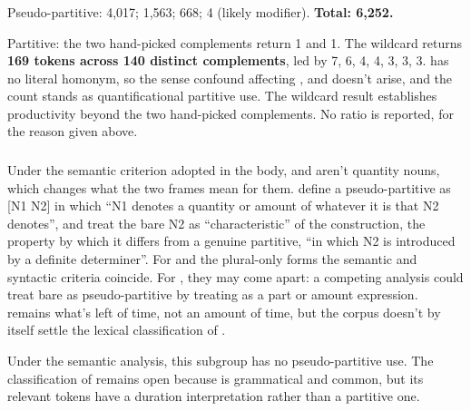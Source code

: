 \subsubsection{\texorpdfstring{}{Plenty}}

Pseudo-partitive:  4,017;  1,563;  668;  4 (likely modifier). \textbf{Total: 6,252.}

Partitive: the two hand-picked complements return  1 and  1. The wildcard  returns \textbf{169 tokens across 140 distinct complements}, led by  7,  6,  4,  4,  3,  3,  3.  has no literal homonym, so the sense confound affecting , and  doesn't arise, and the count stands as quantificational partitive use. The wildcard result establishes productivity beyond the two hand-picked complements. No ratio is reported, for the reason given above.

\subsubsection{\texorpdfstring{}{Rest, remainder}}

Under the semantic criterion adopted in the body,  and  aren't quantity nouns, which changes what the two frames mean for them. \textcite[271]{van-eynde-kim-2023-pseudo-partitives} define a pseudo-partitive as [N1  N2] in which \enquote{N1 denotes a quantity or amount of whatever it is that N2 denotes}, and treat the bare N2 as \enquote{characteristic} of the construction, the property by which it differs from a genuine partitive, \enquote{in which N2 is introduced by a definite determiner}. For  and the plural-only forms the semantic and syntactic criteria coincide. For , they may come apart: a competing analysis could treat bare  as pseudo-partitive by treating  as a part or amount expression.  remains what's left of time, not an amount of time, but the corpus doesn't by itself settle the lexical classification of .

Under the semantic analysis, this subgroup has no pseudo-partitive use. The classification of  remains open because  is grammatical and common, but its relevant tokens have a duration interpretation rather than a partitive one.

